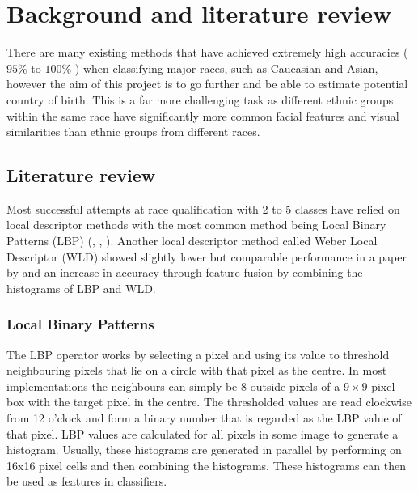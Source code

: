 \chapter{Background and literature review}
\label{background}
There are many existing methods that have achieved extremely high accuracies
($95\%$ to $100\%$ \citep{muhammadg}) when classifying major races, such as
Caucasian and Asian, however the aim of this project is to go further and be
able to estimate potential country of birth. This is a far more challenging
task as different ethnic groups within the same race have significantly more
common facial features and visual similarities than ethnic groups from
different races.

\section{Literature review}
Most successful attempts at race qualification with 2 to 5 classes have relied
on local descriptor methods with the most common method being Local Binary
Patterns (LBP) (\citep{muhammadg}, \citep{yangLBP}, \citep{zhang2D3D}). Another
local descriptor method called Weber Local Descriptor (WLD) showed slightly
lower but comparable performance in a paper by \citep{muhammadg} and an
increase in accuracy through feature fusion by combining the histograms of LBP
and WLD.  

\subsection{Local Binary Patterns}
\label{bg:lbp}
The LBP operator works by selecting a pixel and using its value to threshold
neighbouring pixels that lie on a circle with that pixel as the centre. In most
implementations the neighbours can simply be 8 outside pixels of a $9 \times 9$ pixel
box with the target pixel in the centre.  The thresholded values are read
clockwise from 12 o’clock and form a binary number that is regarded as the LBP
value of that pixel. LBP values are calculated for all pixels in some image to
generate a histogram.  Usually, these histograms are generated in parallel by
performing on 16x16 pixel cells and then combining the histograms. These
histograms can then be used as features in classifiers.  


